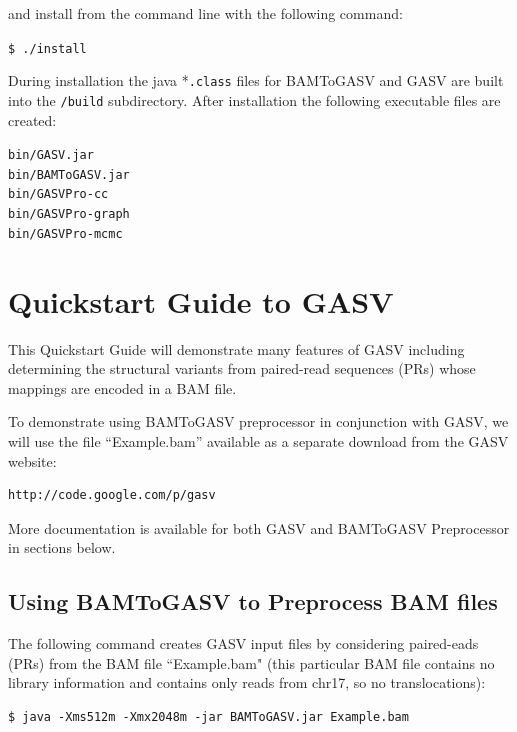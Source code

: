 \documentclass[11pt]{article}
\begin{document}
\noindent and install from the command line with the following command:

\begin{framed}
{\normalsize
\noindent \texttt{\$ ./install}
}
\end{framed}

\noindent During installation the java *\verb+.class+ files for BAMToGASV and GASV are built into the \verb+/build+ subdirectory. After installation the following executable files are created:
	
\begin{framed}
{\normalsize
\noindent \texttt{bin/GASV.jar }\\
\noindent \texttt{bin/BAMToGASV.jar }\\
\noindent \texttt{bin/GASVPro-cc}\\
\noindent \texttt{bin/GASVPro-graph}\\
\noindent \texttt{bin/GASVPro-mcmc}
}
\end{framed}


\section{Quickstart Guide to GASV}

This Quickstart Guide will demonstrate many features of GASV including determining the 
structural variants from paired-read sequences (PRs) whose mappings 
are encoded in a BAM file.

To demonstrate using BAMToGASV preprocessor in conjunction with GASV, we will use the file ``Example.bam'' available as a separate download from the GASV website:

\begin{Verbatim}[frame=single]
http://code.google.com/p/gasv
\end{Verbatim}

More documentation is available for both GASV and BAMToGASV Preprocessor 
in sections below.  

\subsection{Using BAMToGASV to Preprocess BAM files}

The following command creates GASV input files by considering paired-eads (PRs) 
from the BAM file ``Example.bam" (this particular BAM file contains no library information and contains only reads from chr17, so no translocations):
{\normalsize
\begin{Verbatim}[frame=single]
$ java -Xms512m -Xmx2048m -jar BAMToGASV.jar Example.bam
\end{Verbatim}
}
\end{document}
